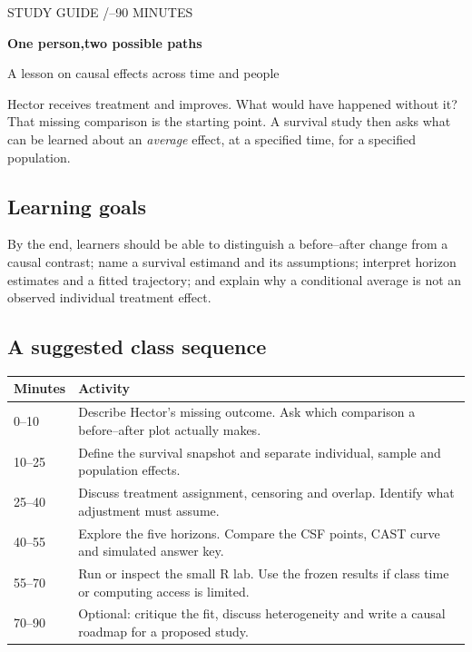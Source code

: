 \documentclass[11pt,letterpaper]{article}
\newcommand{\term}[1]{\textbf{\color{ink}#1}}
\begin{document}
\thispagestyle{fancy}
{\color{teal}\small STUDY GUIDE \enspace /--90 MINUTES}\par
\vspace{6pt}
{\fontsize{29}{34}\selectfont\bfseries\color{ink}One person,\newline two possible paths}\par
\vspace{5pt}
{\large A lesson on causal effects across time and people}

Hector receives treatment and improves. What would have happened without it?
That missing comparison is the starting point. A survival study then asks what
can be learned about an \emph{average} effect, at a specified time, for a specified
population.

\subsection{Learning goals}
By the end, learners should be able to distinguish a before--after change from
a causal contrast; name a survival estimand and its assumptions; interpret
horizon estimates and a fitted trajectory; and explain why a conditional
average is not an observed individual treatment effect.

\subsection{A suggested class sequence}
\renewcommand{\arraystretch}{1.28}
\begin{tabularx}{\linewidth}{@{}p{0.85in}X@{}}
\toprule
\term{Minutes} & \term{Activity} \\
\midrule
0--10 & Describe Hector's missing outcome. Ask which comparison a before--after plot actually makes. \\
10--25 & Define the survival snapshot and separate individual, sample and population effects. \\
25--40 & Discuss treatment assignment, censoring and overlap. Identify what adjustment must assume. \\
40--55 & Explore the five horizons. Compare the CSF points, CAST curve and simulated answer key. \\
55--70 & Run or inspect the small R lab. Use the frozen results if class time or computing access is limited. \\
70--90 & Optional: critique the fit, discuss heterogeneity and write a causal roadmap for a proposed study. \\
\bottomrule
\end{tabularx}
\end{document}
